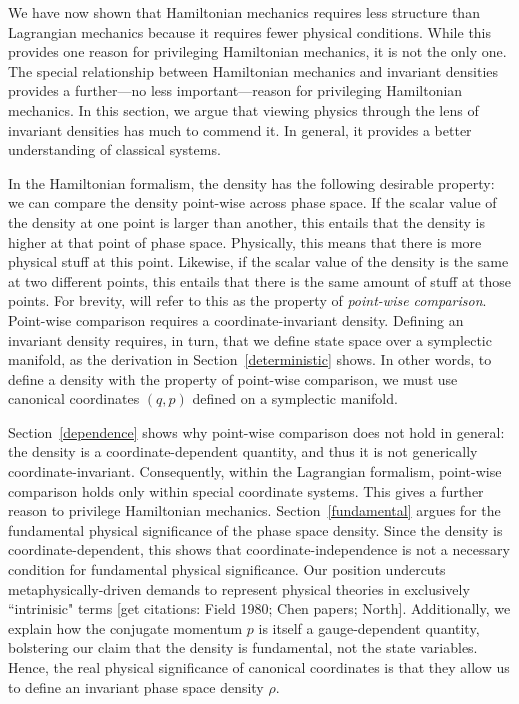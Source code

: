 \documentclass[letterpaper]{article}
\begin{document}
We have now shown that Hamiltonian mechanics requires less structure than Lagrangian mechanics because it requires fewer physical conditions. While this provides one reason for privileging Hamiltonian mechanics, it is not the only one. The special relationship between Hamiltonian mechanics and invariant densities provides a further---no less important---reason for privileging Hamiltonian mechanics. In this section, we argue that viewing physics through the lens of invariant densities has much to commend it. In general, it provides a better understanding of classical systems. 

In the Hamiltonian formalism, the density has the following desirable property: we can compare the density point-wise across phase space. If the scalar value of the density at one point is larger than another, this entails that the density is higher at that point of phase space. Physically, this means that there is more physical stuff at this point. Likewise, if the scalar value of the density is the same at two different points, this entails that there is the same amount of stuff at those points. For brevity, will refer to this as the property of \textit{point-wise comparison}. Point-wise comparison requires a coordinate-invariant density. Defining an invariant density requires, in turn, that we define state space over a symplectic manifold, as the derivation in Section~\ref{deterministic} shows. In other words, to define a density with the property of point-wise comparison, we must use canonical coordinates $(q, p)$ defined on a symplectic manifold. 

Section~\ref{dependence} shows why point-wise comparison does not hold in general: the density is a coordinate-dependent quantity, and thus it is not generically coordinate-invariant. Consequently, within the Lagrangian formalism, point-wise comparison holds only within special coordinate systems. This gives a further reason to privilege Hamiltonian mechanics. Section~\ref{fundamental} argues for the fundamental physical significance of the phase space density. Since the density is coordinate-dependent, this shows that coordinate-independence is not a necessary condition for fundamental physical significance. Our position undercuts metaphysically-driven demands to represent physical theories in exclusively ``intrinisic" terms [get citations: Field 1980; Chen papers; North]. Additionally, we explain how the conjugate momentum $p$ is itself a gauge-dependent quantity, bolstering our claim that the density is fundamental, not the state variables. Hence, the real physical significance of canonical coordinates is that they allow us to define an invariant phase space density $\rho $. 
\end{document}
